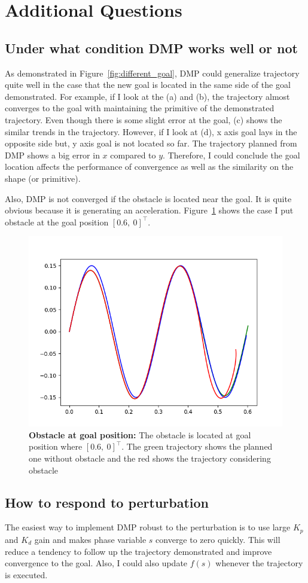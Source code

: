 \documentclass[11pt]{article}
\begin{document}
\section{Additional Questions}

\subsection{Under what condition DMP works well or not}
As demonstrated in Figure~\ref{fig:different_goal}, DMP could generalize
trajectory quite well in the case that the new goal is located in the same side
of the goal demonstrated. For example, if I look at the (a) and (b), the
trajectory almost converges to the goal with maintaining the primitive of the
demonstrated trajectory. Even though there is some slight error at the goal,
(c) shows the similar trends in the trajectory. However, if I look at (d),
x axis goal lays in the opposite side but, y axis goal is not located so far.
The trajectory planned from DMP shows a big error in $x$ compared to $y$.
Therefore, I could conclude the goal location affects the performance of
convergence as well as the similarity on the shape (or primitive).

Also, DMP is not converged if the obstacle is located near the goal. It is quite
obvious because it is generating an acceleration. Figure~\ref{fig:obs_near_goal}
shows the case I put obstacle at the goal position $[0.6,~0]^\top$.
\begin{figure}[htpb]
    \centering
    \includegraphics[width=0.5\linewidth]{figures/obs_at_goal.png}
    \caption{ \textbf{Obstacle at goal position: } The obstacle is located at
    goal position where $[0.6,~0]^\top$. The green trajectory shows the planned one
    without obstacle and the red shows the trajectory considering obstacle}
    \label{fig:obs_near_goal}
\end{figure}

\subsection{How to respond to perturbation}
The easiest way to implement DMP robust to the perturbation is to use large
$K_p$ and $K_d$ gain and makes phase variable $s$ converge to zero quickly.
This will reduce a tendency to follow up the trajectory demonstrated and improve
convergence to the goal. Also, I could also update $f(s)$ whenever the trajectory
is executed.
\end{document}

